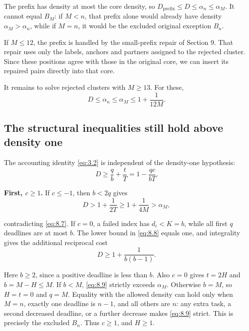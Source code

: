 \documentclass[11pt,a4paper]{article}
\begin{document}
The prefix has density at most the core density, so \(D_{\mathrm{prefix}}\le D\le\alpha_n\le\alpha_M\). It cannot equal \(B_M\): if \(M<n\), that prefix alone would already have density \(\alpha_M>\alpha_n\), while if \(M=n\), it would be the excluded original exception \(B_n\).

If \(M\le12\), the prefix is handled by the small-prefix repair of Section 9. That repair uses only the labels, anchors and partners assigned to the rejected cluster. Since these positions agree with those in the original core, we can insert its repaired pairs directly into that core.

It remains to solve rejected clusters with \(M\ge13\). For these,
\begin{equation}
D\le\alpha_n\le\alpha_M\le1+\frac1{12M}.
\tag{8.7}
\label{eq:8.7}
\end{equation}

\hypertarget{the-structural-inequalities-still-hold-above-density-one}{%
\subsection{The structural inequalities still hold above density one}\label{the-structural-inequalities-still-hold-above-density-one}}

The accounting identity \eqref{eq:3.2} is independent of the density-one hypothesis:
\begin{equation}
D\ge\frac q b+\frac tT
=1-\frac{qc}{bT}.
\tag{8.8}
\label{eq:8.8}
\end{equation}

\textbf{First, \(c\ge1\).} If \(c\le-1\), then \(b<2q\) gives
\[
D>1+\frac1{2T}\ge1+\frac1{4M}>\alpha_M,
\]

contradicting \eqref{eq:8.7}. If \(c=0\), a failed index has \(d_i<K=b\), while all first \(q\) deadlines are at most \(b\). The lower bound in \eqref{eq:8.8} equals one, and integrality gives the additional reciprocal cost
\begin{equation}
D\ge1+\frac1{b(b-1)}.
\tag{8.9}
\label{eq:8.9}
\end{equation}

Here \(b\ge2\), since a positive deadline is less than \(b\). Also \(c=0\) gives \(t=2H\) and \(b=M-H\le M\). If \(b<M\), \eqref{eq:8.9} strictly exceeds \(\alpha_M\). Otherwise \(b=M\), so \(H=t=0\) and \(q=M\). Equality with the allowed density can hold only when \(M=n\), exactly one deadline is \(n-1\), and all others are \(n\): any extra task, a second decreased deadline, or a further decrease makes \eqref{eq:8.9} strict. This is precisely the excluded \(B_n\). Thus \(c\ge1\), and \(H\ge1\).
\end{document}
